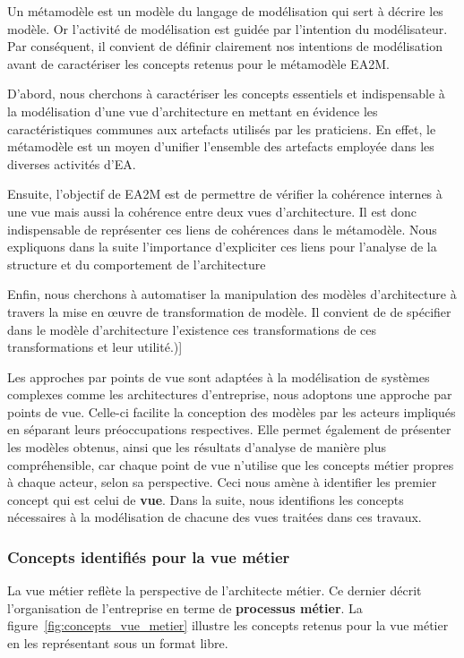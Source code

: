     Un métamodèle est un modèle du langage de modélisation qui sert à décrire les modèle.
    Or l'activité de modélisation est guidée par l’intention du modélisateur.
    Par conséquent, il convient de définir clairement nos intentions de modélisation
    avant de caractériser les concepts retenus pour le métamodèle EA2M.

    D'abord, nous cherchons à caractériser les concepts essentiels et indispensable à la
    modélisation d'une vue d'architecture en mettant en évidence les caractéristiques communes
    aux artefacts utilisés par les praticiens. En effet, le métamodèle est un moyen d'unifier
    l'ensemble des artefacts employée dans les diverses activités d'EA.

    Ensuite, l’objectif de EA2M est de permettre de vérifier la cohérence internes à une vue mais
    aussi la cohérence entre deux vues d'architecture. Il est donc indispensable de représenter
    ces liens de cohérences dans le métamodèle. Nous expliquons dans la suite l'importance
    d'expliciter ces liens pour l'analyse de la structure et du comportement de l'architecture

    Enfin, nous cherchons à automatiser la manipulation des modèles d'architecture à travers
    la mise en œuvre de transformation de modèle. Il convient de de spécifier dans le modèle
    d'architecture l’existence ces transformations de ces transformations et leur utilité.)]

    Les approches par points de vue sont adaptées à la modélisation
    de systèmes complexes comme les architectures d'entreprise, nous adoptons une
    approche par points de vue. Celle-ci facilite la conception des modèles par les
    acteurs impliqués en séparant leurs préoccupations respectives. Elle permet
    également de présenter les modèles obtenus, ainsi que les résultats d'analyse 
    de manière plus compréhensible, car chaque point de vue
    n'utilise que les concepts métier propres à chaque acteur, selon sa perspective.
    Ceci nous amène à identifier les premier concept qui est celui de \textbf{vue}. 
    Dans la suite, nous identifions les concepts nécessaires à la modélisation de
    chacune des vues traitées dans ces travaux.



    \subsubsection{Concepts identifiés pour la vue métier}

    La vue métier reflète la perspective de l'architecte métier. Ce dernier
    décrit l’organisation de l'entreprise en terme de \textbf{processus métier}.
    La figure~\ref{fig:concepts_vue_metier} illustre les concepts retenus pour la vue
    métier en les représentant sous un format libre.

